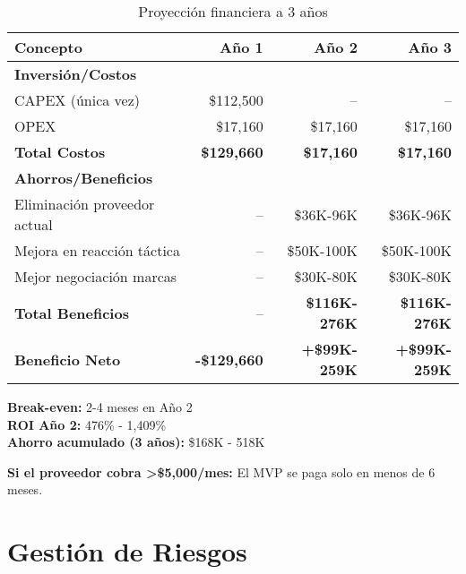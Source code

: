 \documentclass[12pt,a4paper]{article}
\begin{document}
\begin{table}[h]
\centering
\begin{tabularx}{\textwidth}{|X|r|r|r|}
\hline
\rowcolor{lightgray}
\textbf{Concepto} & \textbf{Año 1} & \textbf{Año 2} & \textbf{Año 3} \\
\hline
\textbf{Inversión/Costos} & & & \\
\hline
CAPEX (única vez) & \$112,500 & -- & -- \\
\hline
OPEX & \$17,160 & \$17,160 & \$17,160 \\
\hline
\rowcolor{lightgray}
\textbf{Total Costos} & \textbf{\$129,660} & \textbf{\$17,160} & \textbf{\$17,160} \\
\hline
\textbf{Ahorros/Beneficios} & & & \\
\hline
Eliminación proveedor actual & -- & \$36K-96K & \$36K-96K \\
\hline
Mejora en reacción táctica & -- & \$50K-100K & \$50K-100K \\
\hline
Mejor negociación marcas & -- & \$30K-80K & \$30K-80K \\
\hline
\rowcolor{lightgray}
\textbf{Total Beneficios} & -- & \textbf{\$116K-276K} & \textbf{\$116K-276K} \\
\hline
\rowcolor{successgreen!20}
\textbf{Beneficio Neto} & \textbf{-\$129,660} & \textbf{+\$99K-259K} & \textbf{+\$99K-259K} \\
\hline
\end{tabularx}
\caption{Proyección financiera a 3 años}
\end{table}

\begin{tcolorbox}[colback=successgreen!20, colframe=successgreen, title=\textbf{Conclusión Financiera}]
\textbf{Break-even:} 2-4 meses en Año 2\\
\textbf{ROI Año 2:} 476\% - 1,409\%\\
\textbf{Ahorro acumulado (3 años):} \$168K - 518K

\vspace{0.3cm}
\textbf{Si el proveedor cobra >\$5,000/mes:} El MVP se paga solo en menos de 6 meses.
\end{tcolorbox}

\newpage
\section{Gestión de Riesgos}
\end{document}
